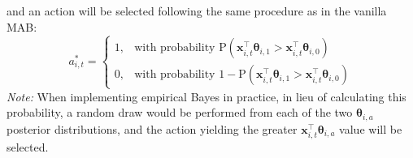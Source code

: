 \documentclass[letterpaper, 9pt]{extarticle}
\begin{document}
and an action will be selected following the same procedure as in the vanilla MAB:
$$a_{i,t}^* =
\begin{cases}
1, & \text{with probability }
\textrm{P}\!\left(
\boldsymbol{x}_{i,t}^\top \boldsymbol{\theta}_{i,1}
>
\boldsymbol{x}_{i,t}^\top \boldsymbol{\theta}_{i,0}
\right) \\[0em]
0, & \text{with probability }
1-
\textrm{P}\!\left(
\boldsymbol{x}_{i,t}^\top \boldsymbol{\theta}_{i,1}
>
\boldsymbol{x}_{i,t}^\top \boldsymbol{\theta}_{i,0}
\right)
\end{cases}$$
\textit{Note:} When implementing empirical Bayes in practice, in lieu of calculating this probability, a random draw would be performed from each of the two $\boldsymbol{\theta}_{i,a}$ posterior distributions, and the action yielding the greater $\boldsymbol{x}_{i,t}^\top \boldsymbol{\theta}_{i,a}$ value will be selected. 
\end{document}
